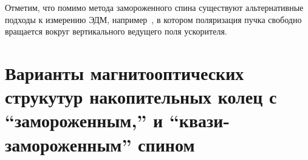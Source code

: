 Отметим, что помимо метода замороженного спина существуют альтернативные подходы к измерению ЭДМ, например~\cite{COSY:SpinTuneMapping, COSY:Partially-Frozen-Spin}, в котором поляризация пучка свободно вращается вокруг вертикального ведущего поля ускорителя.



\section{Варианты магнитооптических струкутур накопительных колец с ``замороженным,'' и ``квази-замороженным'' спином} \label{chpt1:Lattices}



\clearpage